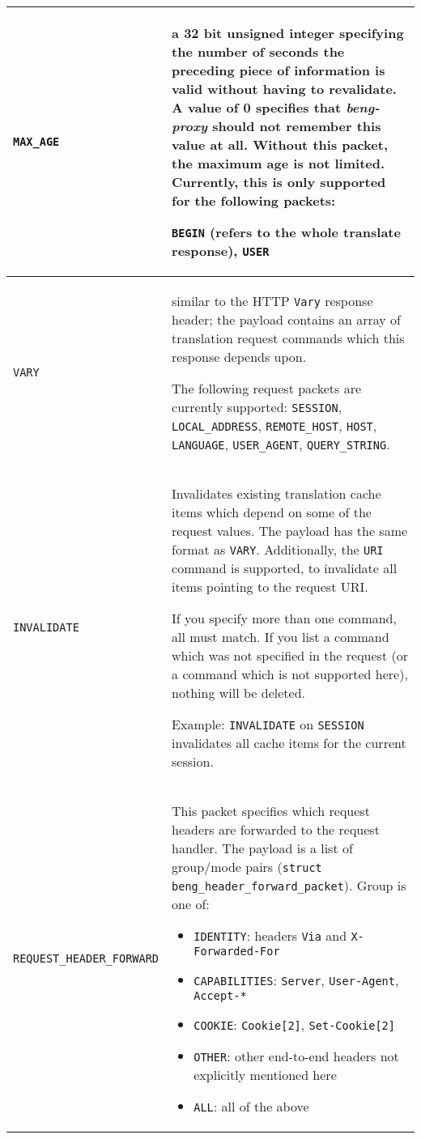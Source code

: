 \documentclass[a4paper,12pt]{article}
\begin{document}
\begin{longtable}{|l|p{8cm}|}
\hline

\verb|MAX_AGE| & a 32 bit unsigned integer specifying the number of
seconds the preceding piece of information is valid without having to
revalidate.  A value of 0 specifies that \emph{beng-proxy} should not
remember this value at all.  Without this packet, the maximum age is
not limited.  Currently, this is only supported for the following
packets:

\verb|BEGIN| (refers to the whole translate response), \verb|USER|
\\

\hline

\verb|VARY| & similar to the HTTP \texttt{Vary} response header;
the payload contains an array of translation request commands which
this response depends upon.

The following request packets are currently supported:
\verb|SESSION|,
\verb|LOCAL_ADDRESS|,
\verb|REMOTE_HOST|, \verb|HOST|, \verb|LANGUAGE|,
\verb|USER_AGENT|, \verb|QUERY_STRING|.

\\

\hline

\verb|INVALIDATE| & Invalidates existing translation cache items
which depend on some of the request values.  The payload has the same
format as \verb|VARY|.  Additionally, the \verb|URI| command is
supported, to invalidate all items pointing to the request URI.

If you specify more than one command, all must match.  If you list a
command which was not specified in the request (or a command which is
not supported here), nothing will be deleted.

Example: \verb|INVALIDATE| on \verb|SESSION| invalidates all cache
items for the current session.

\\

\hline

\label{tfwdheader}
\verb|REQUEST_HEADER_FORWARD| &

This packet specifies which request headers are forwarded to the
request handler.  The payload is a list of group/mode pairs
(\texttt{struct beng\_header\_forward\_packet}).  Group is one of:

\begin{itemize}
\item \texttt{IDENTITY}: headers \texttt{Via} and
  \texttt{X-Forwarded-For}
\item \texttt{CAPABILITIES}: \texttt{Server}, \texttt{User-Agent},
  \texttt{Accept-*}
\item \texttt{COOKIE}: \texttt{Cookie[2]}, \texttt{Set-Cookie[2]}
\item \texttt{OTHER}: other end-to-end headers not explicitly
  mentioned here
\item \texttt{ALL}: all of the above
\end{itemize}


\end{longtable}
\end{document}
